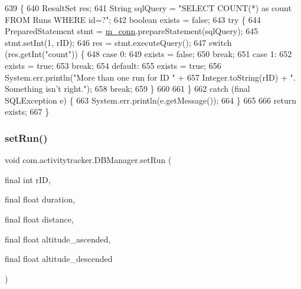 \begin{DoxyCode}
639                                             \{
640         ResultSet res;
641         String sqlQuery = \textcolor{stringliteral}{"SELECT COUNT(*) as count FROM Runs WHERE id=?"};
642         \textcolor{keywordtype}{boolean} exists = \textcolor{keyword}{false};
643         \textcolor{keywordflow}{try} \{
644             PreparedStatement stmt = \mbox{\hyperlink{classcom_1_1activitytracker_1_1_d_b_manager_a064088d13ac09eb147fdc19268771521}{m\_conn}}.prepareStatement(sqlQuery);
645             stmt.setInt(1, rID);
646             res = stmt.executeQuery();
647             \textcolor{keywordflow}{switch} (res.getInt(\textcolor{stringliteral}{"count"})) \{
648                 \textcolor{keywordflow}{case} 0:
649                     exists = \textcolor{keyword}{false};
650                     \textcolor{keywordflow}{break};
651                 \textcolor{keywordflow}{case} 1:
652                     exists = \textcolor{keyword}{true};
653                     \textcolor{keywordflow}{break};
654                 \textcolor{keywordflow}{default}:
655                     exists = \textcolor{keyword}{true};
656                     System.err.println(\textcolor{stringliteral}{"More than one run for ID "} +
657                             Integer.toString(rID) + \textcolor{stringliteral}{". Something isn't right."});
658                     \textcolor{keywordflow}{break};
659             \}
660 
661         \}
662         \textcolor{keywordflow}{catch} (\textcolor{keyword}{final} SQLException e) \{
663             System.err.println(e.getMessage());
664         \}
665 
666         \textcolor{keywordflow}{return} exists;
667     \}
\end{DoxyCode}
\mbox{\label{classcom_1_1activitytracker_1_1_d_b_manager_a72282377a552ce4ce371abff02e312f2}} 
\subsubsection{\texorpdfstring{set\+Run()}{setRun()}}
{\footnotesize\ttfamily void com.\+activitytracker.\+D\+B\+Manager.\+set\+Run (\begin{DoxyParamCaption}\item[{final int}]{r\+ID,  }\item[{final float}]{duration,  }\item[{final float}]{distance,  }\item[{final float}]{altitude\+\_\+ascended,  }\item[{final float}]{altitude\+\_\+descended }\end{DoxyParamCaption})}


